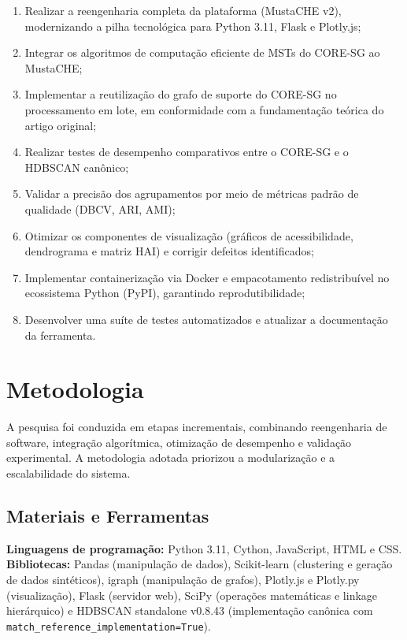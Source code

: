\documentclass[12pt,a4paper,oneside]{article}
\let\cite\citep
\begin{document}
\begin{enumerate}
  \item Realizar a reengenharia completa da plataforma (MustaCHE v2), modernizando a pilha
        tecnológica para Python 3.11, Flask e Plotly.js;
  \item Integrar os algoritmos de computação eficiente de MSTs do CORE-SG ao MustaCHE;
  \item Implementar a reutilização do grafo de suporte do CORE-SG no processamento em lote,
        em conformidade com a fundamentação teórica do artigo original;
  \item Realizar testes de desempenho comparativos entre o CORE-SG e o HDBSCAN canônico;
  \item Validar a precisão dos agrupamentos por meio de métricas padrão de qualidade
        (DBCV, ARI, AMI);
  \item Otimizar os componentes de visualização (gráficos de acessibilidade, dendrograma e
        matriz HAI) e corrigir defeitos identificados;
  \item Implementar containerização via Docker e empacotamento redistribuível no ecossistema
        Python (PyPI), garantindo reprodutibilidade;
  \item Desenvolver uma suíte de testes automatizados e atualizar a documentação da ferramenta.
\end{enumerate}

\section{Metodologia}

A pesquisa foi conduzida em etapas incrementais, combinando reengenharia de software,
integração algorítmica, otimização de desempenho e validação experimental. A metodologia
adotada priorizou a modularização e a escalabilidade do sistema.

\subsection{Materiais e Ferramentas}

\textbf{Linguagens de programação:} Python 3.11, Cython, JavaScript, HTML e CSS.
\textbf{Bibliotecas:} Pandas (manipulação de dados), Scikit-learn \cite{pedregosa2011scikit}
(clustering e geração de dados sintéticos), igraph (manipulação de grafos), Plotly.js e
Plotly.py (visualização), Flask (servidor web), SciPy (operações matemáticas e linkage
hierárquico) e HDBSCAN standalone v0.8.43 (implementação canônica com
\texttt{match\_reference\_implementation=True}).
\end{document}
